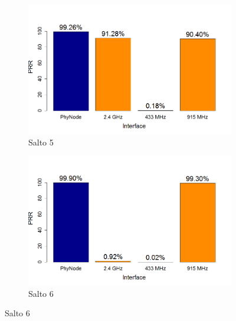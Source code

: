 \documentclass[
	12pt,				%
	openright,			%
	oneside,
	a4paper,			%
	english,			%
	french,				%
	spanish,			%
	brazil				%
	]{abntex2}
\begin{document}
\begin{figure}[ht]\ContinuedFloat	
	\begin{subfigure}{.5\textwidth}
		\centering
		\includegraphics[width=.98\linewidth]{PRR_OPT_Salto5}
		\captionsetup{width=.9\textwidth}
		\caption{Salto 5}
		\label{prr_opt_s5}
	\end{subfigure}%
	\begin{subfigure}{.5\textwidth}
		\centering
		\includegraphics[width=.98\linewidth]{PRR_OPT_Salto6}
		\captionsetup{width=.9\textwidth}
		\caption{Salto 6}
		\label{prr_opt_s6}
	\end{subfigure}
\end{figure}
\end{document}

